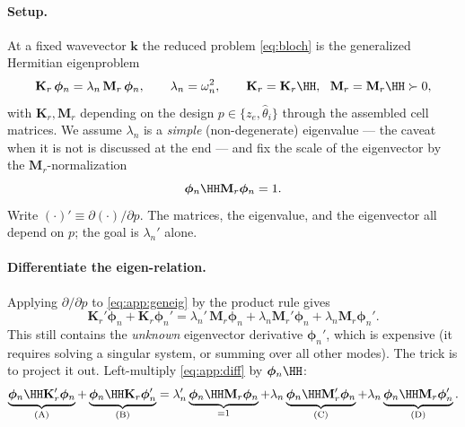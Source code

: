 \documentclass[11pt]{article}
\begin{document}
\paragraph{Setup.} At a fixed wavevector $\mathbf k$ the reduced problem
\eqref{eq:bloch} is the generalized Hermitian eigenproblem
\begin{equation}
  \mathbf K_r\,\bm\phi_n=\lambda_n\,\mathbf M_r\,\bm\phi_n,\qquad
  \lambda_n=\omega_n^2,\qquad
  \mathbf K_r=\mathbf K_r\HH,\ \ \mathbf M_r=\mathbf M_r\HH\succ0,
  \label{eq:app:geneig}
\end{equation}
with $\mathbf K_r,\mathbf M_r$ depending on the design $p\in\{z_e,\hat\theta_i\}$
through the assembled cell matrices. We assume $\lambda_n$ is a \emph{simple}
(non-degenerate) eigenvalue --- the caveat when it is not is discussed at the end
--- and fix the scale of the eigenvector by the $\mathbf M_r$-normalization
\begin{equation}
  \bm\phi_n\HH\mathbf M_r\bm\phi_n=1.
  \label{eq:app:norm}
\end{equation}
Write $(\cdot)'\equiv\partial(\cdot)/\partial p$. The matrices, the eigenvalue,
and the eigenvector all depend on $p$; the goal is $\lambda_n'$ alone.

\paragraph{Differentiate the eigen-relation.} Applying $\partial/\partial p$ to
\eqref{eq:app:geneig} by the product rule gives
\begin{equation}
  \mathbf K_r'\bm\phi_n+\mathbf K_r\bm\phi_n'
  =\lambda_n'\,\mathbf M_r\bm\phi_n
  +\lambda_n\mathbf M_r'\bm\phi_n
  +\lambda_n\mathbf M_r\bm\phi_n'.
  \label{eq:app:diff}
\end{equation}
This still contains the \emph{unknown} eigenvector derivative $\bm\phi_n'$, which
is expensive (it requires solving a singular system, or summing over all other
modes). The trick is to project it out. Left-multiply \eqref{eq:app:diff} by
$\bm\phi_n\HH$:
\begin{equation}
  \underbrace{\bm\phi_n\HH\mathbf K_r'\bm\phi_n}_{\text{(A)}}
  +\underbrace{\bm\phi_n\HH\mathbf K_r\bm\phi_n'}_{\text{(B)}}
  =\lambda_n'\underbrace{\bm\phi_n\HH\mathbf M_r\bm\phi_n}_{=1}
  +\lambda_n\underbrace{\bm\phi_n\HH\mathbf M_r'\bm\phi_n}_{\text{(C)}}
  +\lambda_n\underbrace{\bm\phi_n\HH\mathbf M_r\bm\phi_n'}_{\text{(D)}}.
  \label{eq:app:projected}
\end{equation}
\end{document}
